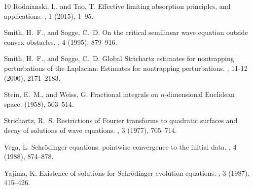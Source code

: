 \documentclass[10pt,leqno]{amsart}
\theoremstyle{definition}%
\theoremstyle{remark}
\numberwithin{equation}{section}
\renewcommand{\^}{\widehat}%
\begin{document}
\begin{thebibliography}{10}
{\sc Rodnianski, I., and Tao, T.}
\newblock Effective limiting absorption principles, and applications.
, 1 (2015), 1--95.

{\sc Smith, H.~F., and Sogge, C.~D.}
\newblock On the critical semilinear wave equation outside convex obstacles.
, 4 (1995), 879--916.

{\sc Smith, H.~F., and Sogge, C.~D.}
\newblock Global {S}trichartz estimates for nontrapping perturbations of the
  {L}aplacian: Estimates for nontrapping perturbations.
, 11-12 (2000),
  2171--2183.

{\sc Stein, E.~M., and Weiss, G.}
\newblock Fractional integrals on {{\(n\)}}-dimensional {Euclidean} space.
 (1958), 503--514.

{\sc Strichartz, R.~S.}
\newblock Restrictions of {F}ourier transforms to quadratic surfaces and decay
  of solutions of wave equations.
, 3 (1977), 705--714.

{\sc Vega, L.}
\newblock Schr\"odinger equations: pointwise convergence to the initial data.
, 4 (1988), 874--878.

{\sc Yajima, K.}
\newblock Existence of solutions for {S}chr\"odinger evolution equations.
, 3 (1987), 415--426.

\end{thebibliography}
\end{document}
